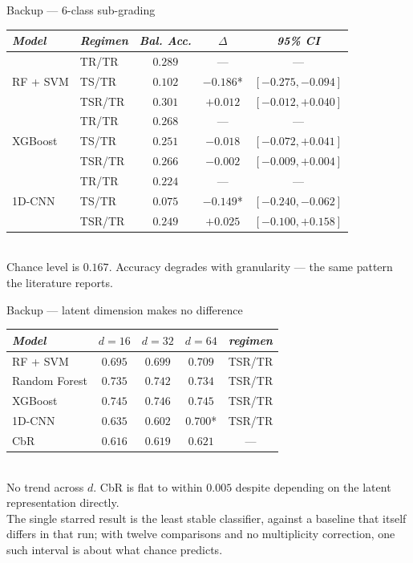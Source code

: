 \documentclass[aspectratio=169, 11pt]{beamer}
\newcommand{\srcnote}[1]{{\scriptsize\color{gray}#1}}
\begin{document}
\begin{frame}{Backup --- 6-class sub-grading}
  \vspace{0.3em}
  \centering
  \small
  \begin{tabular}{llccc}
    \toprule
    \emph{Model} & \emph{Regimen} & \emph{Bal. Acc.} & \emph{$\Delta$} & \emph{95\% CI}\\
    \midrule
    \multirow{3}{*}{RF + SVM} & TR/TR & $0.289$ & --- & ---\\
      & TS/TR  & $0.102$ & $-0.186$\alert{*} & $[-0.275, -0.094]$\\
      & TSR/TR & $0.301$ & $+0.012$ & $[-0.012, +0.040]$\\
    \midrule
    \multirow{3}{*}{XGBoost} & TR/TR & $0.268$ & --- & ---\\
      & TS/TR  & $0.251$ & $-0.018$ & $[-0.072, +0.041]$\\
      & TSR/TR & $0.266$ & $-0.002$ & $[-0.009, +0.004]$\\
    \midrule
    \multirow{3}{*}{1D-CNN} & TR/TR & $0.224$ & --- & ---\\
      & TS/TR  & $0.075$ & $-0.149$\alert{*} & $[-0.240, -0.062]$\\
      & TSR/TR & $0.249$ & $+0.025$ & $[-0.100, +0.158]$\\
    \bottomrule
  \end{tabular}\\[0.5em]
  \srcnote{Chance level is $0.167$. Accuracy degrades with granularity ---
    the same pattern the literature reports.}
\end{frame}

\begin{frame}{Backup --- latent dimension makes no difference}
  \vspace{0.3em}
  \centering
  \small
  \begin{tabular}{lcccc}
    \toprule
    \emph{Model} & $d=16$ & $d=32$ & $d=64$ & \emph{regimen}\\
    \midrule
    RF + SVM & $0.695$ & $0.699$ & $0.709$ & TSR/TR\\
    Random Forest & $0.735$ & $0.742$ & $0.734$ & TSR/TR\\
    XGBoost & $0.745$ & $0.746$ & $0.745$ & TSR/TR\\
    1D-CNN & $0.635$ & $0.602$ & $0.700$\alert{*} & TSR/TR\\
    \midrule
    CbR & $0.616$ & $0.619$ & $0.621$ & ---\\
    \bottomrule
  \end{tabular}\\[0.6em]
  \small No trend across $d$. CbR is flat to within $0.005$ despite depending on
  the latent representation directly.\\[0.3em]
  \srcnote{The single starred result is the least stable classifier, against a
    baseline that itself differs in that run; with twelve comparisons and no
    multiplicity correction, one such interval is about what chance predicts.}
\end{frame}
\end{document}
